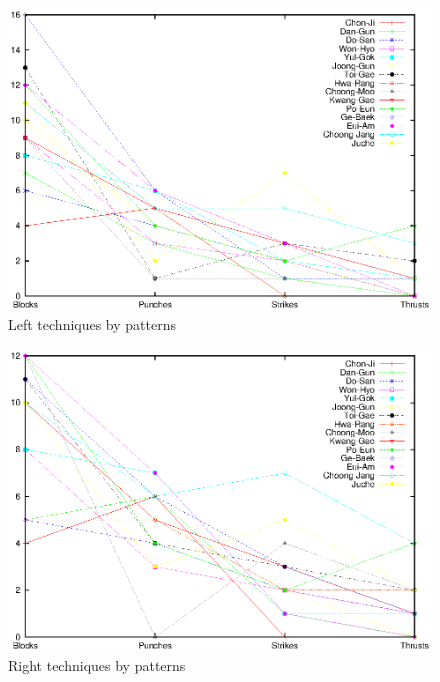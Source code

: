 \documentclass[10pt,twocolumn,a4paper]{article}
\begin{document}
  \begin{figure}
    \includegraphics[scale=0.72]{data/gnuplot/eps/patterns_left}
    \caption{Left techniques by patterns}
    \label{fig:patterns_left}
  \end{figure}

  \begin{figure}
    \includegraphics[scale=0.72]{data/gnuplot/eps/patterns_right}
    \caption{Right techniques by patterns}
    \label{fig:patterns_right}
  \end{figure}




\clearpage
\end{document}
